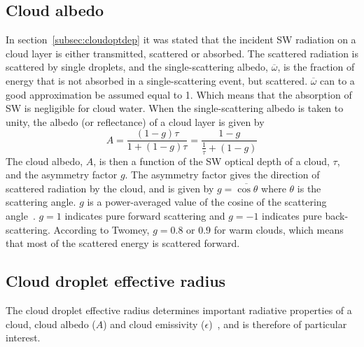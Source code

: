 \subsection{Cloud albedo}
In section~\ref{subsec:cloudoptdep} it was stated that the incident SW radiation on a cloud layer is either transmitted, scattered or absorbed. The scattered radiation is scattered by single droplets, and the single-scattering albedo, $\overline{\omega}$, is the fraction of energy that is not absorbed in a single-scattering event, but scattered. $\overline{\omega}$ can to a good approximation be assumed equal to 1. Which means that the absorption of SW is negligible for cloud water. When the single-scattering albedo is taken to unity, the albedo (or reflectance) of a cloud layer is given by~\citep{Hobbs1993}%
\begin{equation}
A = \frac{(1-g)\tau}{1+(1-g)\tau} = \frac{1-g}{\frac{1}{\tau}+(1-g)}
\label{eqn:cloudalbedo}
\end{equation}
The cloud albedo, $A$, is then a function of the SW optical depth of a cloud, $\tau$, and the asymmetry factor $g$. The asymmetry factor gives the direction of scattered radiation by the cloud, and is given by $g=\overline{\cos \theta}$ where $\theta$ is the scattering angle. $g$ is a power-averaged value of the cosine of the scattering angle~\citep{Twomey1974}. $g=1$ indicates pure forward scattering and $g=-1$ indicates pure back-scattering. According to Twomey, $g=0.8$ or $0.9$ for warm clouds, which means that most of the scattered energy is scattered forward.




\subsection{Cloud droplet effective radius}
\label{subsec:effectiveradius}
The cloud droplet effective radius determines important radiative properties of a cloud, cloud albedo ($A$) and cloud emissivity ($\epsilon$)~\citep{Hansen1974}, and is therefore of particular interest. 


